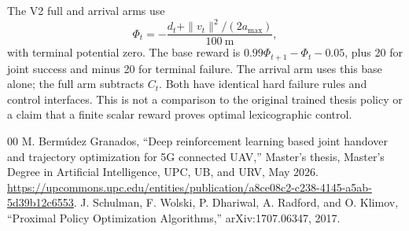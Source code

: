 \documentclass[conference]{IEEEtran}
\begin{document}
The V2 full and arrival arms use
\begin{equation}
\Phi_t=-\frac{d_t+\|v_t\|^2/(2a_{\max})}{100\ \mathrm{m}},
\end{equation}
with terminal potential zero. The base reward is $0.99\Phi_{t+1}-\Phi_t-0.05$,
plus 20 for joint success and minus 20 for terminal failure. The arrival arm
uses this base alone; the full arm subtracts $C_t$. Both have identical hard
failure rules and control interfaces. This is not a comparison to the original
trained thesis policy or a claim that a finite scalar reward proves optimal
lexicographic control.




\begin{thebibliography}{00}
 M. Berm\'udez Granados, ``Deep reinforcement learning based joint
handover and trajectory optimization for 5G connected UAV,'' Master's thesis,
Master's Degree in Artificial Intelligence, UPC, UB, and URV, May 2026.
\url{https://upcommons.upc.edu/entities/publication/a8ce08c2-c238-4145-a5ab-5d39b12c6553}.
 J. Schulman, F. Wolski, P. Dhariwal, A. Radford, and O. Klimov,
``Proximal Policy Optimization Algorithms,'' arXiv:1707.06347, 2017.
\end{thebibliography}
\end{document}
